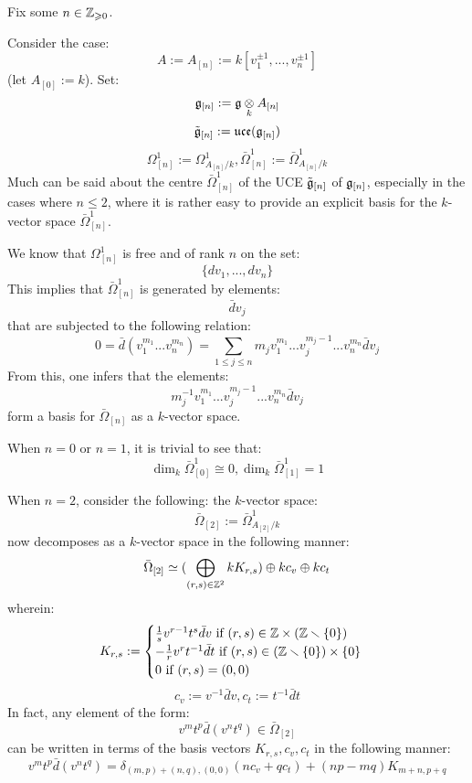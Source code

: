         \begin{example}
            Fix some $n \in \mathbb{Z}_{\geqslant 0}$.
        
            Consider the case:
                $$A := A_{[n]} := k[v_1^{\pm 1}, ..., v_n^{\pm 1}]$$
            (let $A_{[0]} := k$). Set:
                $$\g_{[n]} := \g \tensor_k A_{[n]}$$
                $$\tilde{\mathfrak{g}}_{[n]} := \mathfrak{uce}(\mathfrak{g}_{[n]})$$
                $$\Omega^1_{[n]} := \Omega^1_{A_{[n]}/k}, \bar{\Omega}^1_{[n]} := \bar{\Omega}^1_{A_{[n]}/k}$$
            Much can be said about the centre $\bar{\Omega}^1_{[n]}$ of the UCE $\tilde{\mathfrak{g}}_{[n]}$ of $\mathfrak{g}_{[n]}$, especially in the cases where $n \leq 2$, where it is rather easy to provide an explicit basis for the $k$-vector space $\bar{\Omega}^1_{[n]}$. 

            We know that $\Omega^1_{[n]}$ is free and of rank $n$ on the set:
                $$\{dv_1, ..., dv_n\}$$
            This implies that $\bar{\Omega}^1_{[n]}$ is generated by elements:
                $$\bar{d}v_j$$
            that are subjected to the following relation:
                $$0 = \bar{d}( v_1^{m_1} ... v_n^{m_n} ) = \sum_{1 \leq j \leq n} m_j v_1^{m_1} ... v_j^{m_j - 1} ... v_n^{m_n} \bar{d}v_j$$
            From this, one infers that the elements:
                $$m_j^{-1} v_1^{m_1} ... v_j^{m_j - 1} ... v_n^{m_n} \bar{d}v_j$$
            form a basis for $\bar{\Omega}_{[n]}$ as a $k$-vector space.

            When $n = 0$ or $n = 1$, it is trivial to see that:
                $$\dim_k \bar{\Omega}^1_{[0]} \cong 0, \dim_k \bar{\Omega}^1_{[1]} = 1$$

            When $n = 2$, consider the following: the $k$-vector space:
                $$\bar{\Omega}_{[2]} := \bar{\Omega}^1_{A_{[2]}/k}$$
            now decomposes as a $k$-vector space in the following manner:
                $$\bar{\Omega}_{[2]} \simeq ( \bigoplus_{(r, s) \in \mathbb{Z}^2} k K_{r, s}) \oplus k c_v \oplus k c_t$$
            wherein:
                $$
                    K_{r, s} :=
                    \begin{cases}
                        \text{$\frac1s v^{r - 1} t^s \bar{d}v$ if $(r, s) \in \Z \x (\Z \setminus \{0\})$}
                        \\
                        \text{$-\frac1r v^r t^{-1} \bar{d}t$ if $(r, s) \in (\Z \setminus \{0\}) \x \{0\}$}
                        \\
                        \text{$0$ if $(r, s) = (0, 0)$}
                    \end{cases}
                $$
                $$c_v := v^{-1} \bar{d}v, c_t := t^{-1} \bar{d}t$$
            In fact, any element of the form:
                $$v^m t^p \bar{d}(v^n t^q) \in \bar{\Omega}_{[2]}$$
            can be written in terms of the basis vectors $K_{r, s}, c_v, c_t$ in the following manner:
                $$v^m t^p \bar{d}(v^n t^q) = \delta_{(m, p) + (n, q), (0, 0)} ( n c_v + q c_t ) + (np - mq) K_{m + n, p + q}$$
        \end{example}
